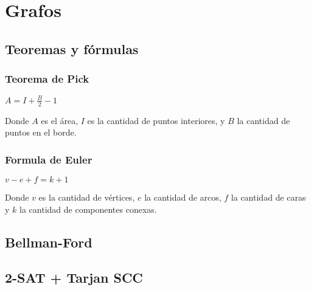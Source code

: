 {\section{Grafos}%
\subsection{Teoremas y fórmulas}
{
\subsubsection{Teorema de Pick}
{
$A=I+\frac{B}{2}-1$

Donde \(A\) es el área, \(I\) es la cantidad de puntos interiores, y \(B\) la cantidad de puntos en el borde.
}

\subsubsection{Formula de Euler}
{
$v-e+f=k+1$

Donde \(v\) es la cantidad de vértices, \(e\) la cantidad de arcos, \(f\) la cantidad de caras y \(k\) la cantidad de componentes conexas.
}
}
\subsection{Bellman-Ford}
\subsection{2-SAT + Tarjan SCC}
}
